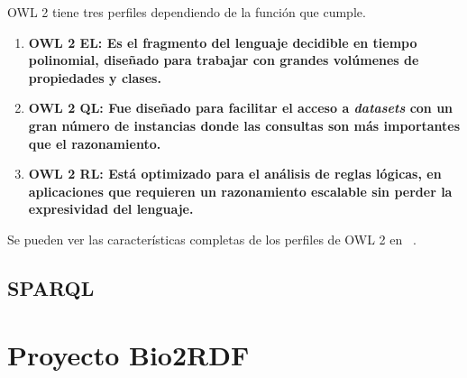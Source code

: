 OWL 2 tiene tres perfiles dependiendo de la función que cumple.
\begin{enumerate}
  \item \bf{OWL 2 EL}: 
    Es el fragmento del lenguaje decidible en tiempo polinomial, diseñado para
    trabajar con grandes volúmenes de propiedades y clases.
  \item \bf{OWL 2 QL}:
    Fue diseñado para facilitar el acceso a \emph{datasets} con un gran número
    de instancias donde las consultas son más importantes que el razonamiento.
  \item \bf{OWL 2 RL}:
    Está optimizado para el análisis de reglas lógicas, en aplicaciones que
    requieren un razonamiento escalable sin perder la expresividad del lenguaje.
\end{enumerate}
Se pueden ver las características completas de los perfiles de OWL 2 en
~\cite{motik2009owlprofiles}.

\subsection{SPARQL}

\section{Proyecto Bio2RDF}\label{ea:bio}


